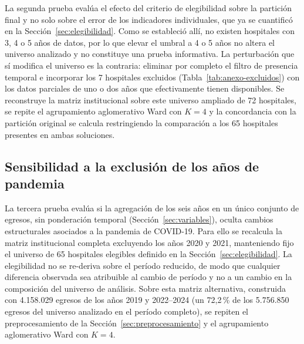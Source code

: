 La segunda prueba evalúa el efecto del criterio de elegibilidad sobre la
partición final y no solo sobre el error de los indicadores individuales, que ya
se cuantificó en la Sección~\ref{sec:elegibilidad}. Como se estableció allí, no
existen hospitales con 3, 4 o 5 años de datos, por lo que elevar el umbral a 4 o
5 años no altera el universo analizado y no constituye una prueba informativa. La
perturbación que sí modifica el universo es la contraria: eliminar por completo
el filtro de presencia temporal e incorporar los 7 hospitales excluidos
(Tabla~\ref{tab:anexo-excluidos}) con los datos parciales de uno o dos años que
efectivamente tienen disponibles. Se reconstruye la matriz institucional sobre
este universo ampliado de 72 hospitales, se repite el agrupamiento aglomerativo
Ward con $K=4$ y la concordancia con la partición original se calcula
restringiendo la comparación a los 65 hospitales presentes en ambas soluciones.

\subsection{Sensibilidad a la exclusión de los años de pandemia}
\label{sec:sensibilidad-temporal}

La tercera prueba evalúa si la agregación de los seis años en un único conjunto
de egresos, sin ponderación temporal (Sección~\ref{sec:variables}), oculta
cambios estructurales asociados a la pandemia de COVID-19. Para ello se recalcula
la matriz institucional completa excluyendo los años 2020 y 2021, manteniendo
fijo el universo de 65 hospitales elegibles definido en la
Sección~\ref{sec:elegibilidad}. La elegibilidad no se re-deriva sobre el período
reducido, de modo que cualquier diferencia observada sea atribuible al cambio de
período y no a un cambio en la composición del universo de análisis. Sobre esta
matriz alternativa, construida con 4.158.029 egresos de los años 2019 y
2022--2024 (un 72{,}2\,\% de los 5.756.850 egresos del universo analizado en el
período completo), se repiten el
preprocesamiento de la Sección~\ref{sec:preprocesamiento} y el agrupamiento
aglomerativo Ward con $K=4$.

